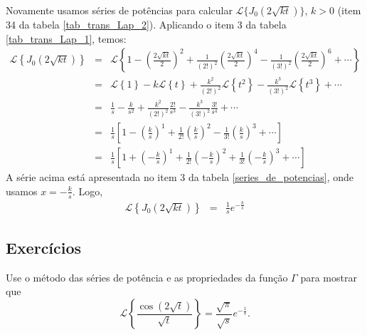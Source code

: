 \begin{ex}Novamente usamos séries de potências para calcular $\mathcal{L}\{J_0(2\sqrt{kt})\}$, $k>0$ (item 34 da tabela \ref{tab_trans_Lap_2}). Aplicando o item 3 da tabela \ref{tab_trans_Lap_1}, temos:
\begin{eqnarray*}
\mathcal{L}\left\{J_0(2\sqrt{kt})\right\}&=&\mathcal{L}\left\{1-\left(\frac{2\sqrt{kt}}{2}\right)^2+\frac{1}{(2!)^2}\left(\frac{2\sqrt{kt}}{2}\right)^4-\frac{1}{(3!)^2}\left(\frac{2\sqrt{kt}}{2}\right)^6+\cdots\right\}\\
&=&\mathcal{L}\left\{1\right\}-k\mathcal{L}\left\{t\right\}+\frac{k^2}{(2!)^2}\mathcal{L}\left\{t^2\right\}-\frac{k^3}{(3!)^2}\mathcal{L}\left\{t^3\right\}+\cdots\\
&=&\frac{1}{s}-\frac{k}{s^2}+\frac{k^2}{(2!)^2}\frac{2!}{s^3}-\frac{k^3}{(3!)^2}\frac{3!}{s^4}+\cdots\\
&=&\frac{1}{s}\left[1-\left(\frac{k}{s}\right)^1+\frac{1}{2!}\left(\frac{k}{s}\right)^2-\frac{1}{3!}\left(\frac{k}{s}\right)^3+\cdots\right]\\
&=&\frac{1}{s}\left[1+\left(-\frac{k}{s}\right)^1+\frac{1}{2!}\left(-\frac{k}{s}\right)^2+\frac{1}{3!}\left(-\frac{k}{s}\right)^3+\cdots\right]
\end{eqnarray*}
A série acima está apresentada no item 3 da tabela \ref{series_de_potencias}, onde usamos $x=-\frac{k}{s}$. Logo,
\begin{eqnarray*}
\mathcal{L}\left\{J_0(2\sqrt{kt})\right\}&=&\frac{1}{s}e^{-\frac{k}{s}}
\end{eqnarray*}
\end{ex}

\subsection*{Exercícios}
\begin{exer}Use o método das séries de potência e as propriedades da função $\Gamma$ para mostrar que
\begin{equation}
\mathcal{L}\left\{\frac{\cos(2\sqrt{t})}{\sqrt{t}}\right\}=\frac{\sqrt{\pi}}{\sqrt{s}}e^{-\frac{1}{s}}.
\end{equation}
\end{exer}

